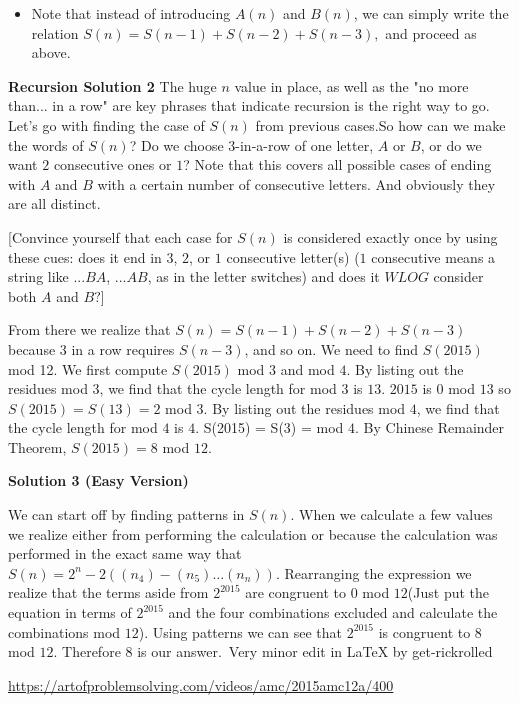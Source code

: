 \begin{enumerate}
 
            \begin{itemize}
        \item Note that instead of introducing $A(n)$ and $B(n)$, we can simply write the relation $S(n)=S(n-1)+S(n-2)+S(n-3),$ and proceed as above.
            \end{itemize}
            \textbf{Recursion Solution 2} The huge $n$ value in place, as well as the "no more than... in a row" are key phrases that indicate recursion is the right way to go. Let's go with finding the case of $S(n)$ from previous cases.So how can we make the words of $S(n)$? Do we choose 3-in-a-row of one letter, $A$ or $B$, or do we want $2$ consecutive ones or $1$? Note that this covers all possible cases of ending with $A$ and $B$ with a certain number of consecutive letters. And obviously they are all distinct.

 [Convince yourself that each case for $S(n)$ is considered exactly once by using these cues: does it end in $3$, $2$, or $1$ consecutive letter(s) ($1$ consecutive means a string like ...$BA$, ...$AB$, as in the letter switches) and does it $WLOG$ consider both $A$ and $B?$]

 From there we realize that $S(n)=S(n-1)+S(n-2)+S(n-3)$ because 3 in a row requires $S(n-3)$, and so on. We need to find $S(2015)$ mod 12. We first compute $S(2015)$ mod $3$ and mod $4$. By listing out the residues mod $3$, we find that the cycle length for mod $3$ is $13$. $2015$ is $0$ mod $13$ so $S(2015) = S(13) = 2$ mod $3$. By listing out the residues mod $4$, we find that the cycle length for mod $4$ is $4$. S(2015) = S(3) = mod $4$. By Chinese Remainder Theorem, $S(2015) =\boxed{8}$ mod $12$.

 



\textbf{Solution 3 (Easy Version)}

We can start off by finding patterns in $S(n)$. When we calculate a few values we realize either from performing the calculation or because the calculation was performed in the exact same way that $S(n) = 2^n - 2((n_4)- (n_5) \dots (n_n))$. Rearranging the expression we realize that the terms aside from $2^{2015}$ are congruent to $0$ mod $12$(Just put the equation in terms of $2^{2015}$ and the four combinations excluded and calculate the combinations mod $12$). Using patterns we can see that $2^{2015}$ is congruent to $8$ mod $12$. Therefore $\boxed {8}$ is our answer.~Very minor edit in LaTeX by get-rickrolled

 \href{https://artofproblemsolving.com/videos/amc/2015amc12a/400}{https://artofproblemsolving.com/videos/amc/2015amc12a/400}


\end{enumerate}
